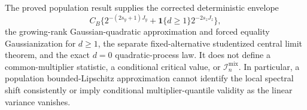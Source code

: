 The proved population result supplies the corrected deterministic envelope
\[
C_B\{2^{-(2s_y+1)J_y}+\mathbf 1\{d\ge1\}2^{-2s_zJ_z}\},
\]
the growing-rank Gaussian-quadratic approximation and forced equality Gaussianization for \(d\ge1\), the separate fixed-alternative studentized central limit theorem, and the exact \(d=0\) quadratic-process law.  It does not define a common-multiplier statistic, a conditional critical value, or \(\mathcal I_n^{\mathrm{mix}}\).  In particular, a population bounded-Lipschitz approximation cannot identify the local spectral shift consistently or imply conditional multiplier-quantile validity as the linear variance vanishes.